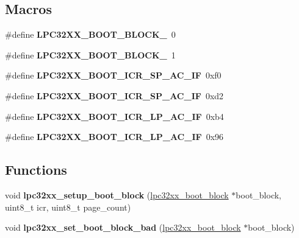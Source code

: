 \subsection*{Macros}
\begin{DoxyCompactItemize}
\item 
\mbox{\label{group__lpc32xx__boot_gaefea30d1ec3180845c9f9de242f2b6f6}} 
\#define {\bfseries L\+P\+C32\+X\+X\+\_\+\+B\+O\+O\+T\+\_\+\+B\+L\+O\+C\+K\+\_}~0
\item 
\mbox{\label{group__lpc32xx__boot_ga8b79ee4e35418c683b55c6242098f6fc}} 
\#define {\bfseries L\+P\+C32\+X\+X\+\_\+\+B\+O\+O\+T\+\_\+\+B\+L\+O\+C\+K\+\_}~1
\item 
\mbox{\label{group__lpc32xx__boot_ga662835daa1caf11d8712de986cf299c4}} 
\#define {\bfseries L\+P\+C32\+X\+X\+\_\+\+B\+O\+O\+T\+\_\+\+I\+C\+R\+\_\+\+S\+P\+\_\+A\+C\+\_\+IF}~0xf0
\item 
\mbox{\label{group__lpc32xx__boot_gac9fc17787dd221735632ec7b9059181d}} 
\#define {\bfseries L\+P\+C32\+X\+X\+\_\+\+B\+O\+O\+T\+\_\+\+I\+C\+R\+\_\+\+S\+P\+\_\+A\+C\+\_\+IF}~0xd2
\item 
\mbox{\label{group__lpc32xx__boot_ga3f8ec07f30d46371ad9cc050323af5e8}} 
\#define {\bfseries L\+P\+C32\+X\+X\+\_\+\+B\+O\+O\+T\+\_\+\+I\+C\+R\+\_\+\+L\+P\+\_\+A\+C\+\_\+IF}~0xb4
\item 
\mbox{\label{group__lpc32xx__boot_ga84706fe83906c5ff68564470abec2098}} 
\#define {\bfseries L\+P\+C32\+X\+X\+\_\+\+B\+O\+O\+T\+\_\+\+I\+C\+R\+\_\+\+L\+P\+\_\+A\+C\+\_\+IF}~0x96
\end{DoxyCompactItemize}
\subsection*{Functions}
\begin{DoxyCompactItemize}
\item 
\mbox{\label{group__lpc32xx__boot_ga3f87f3b59fb768f6625eb33b90581ec1}} 
void {\bfseries lpc32xx\+\_\+setup\+\_\+boot\+\_\+block} (\mbox{\hyperlink{unionlpc32xx__boot__block}{lpc32xx\+\_\+boot\+\_\+block}} $\ast$boot\+\_\+block, uint8\+\_\+t icr, uint8\+\_\+t page\+\_\+count)
\item 
\mbox{\label{group__lpc32xx__boot_gad9b1af575e700e0dbdf2880e0b79bada}} 
void {\bfseries lpc32xx\+\_\+set\+\_\+boot\+\_\+block\+\_\+bad} (\mbox{\hyperlink{unionlpc32xx__boot__block}{lpc32xx\+\_\+boot\+\_\+block}} $\ast$boot\+\_\+block)
\end{DoxyCompactItemize}


